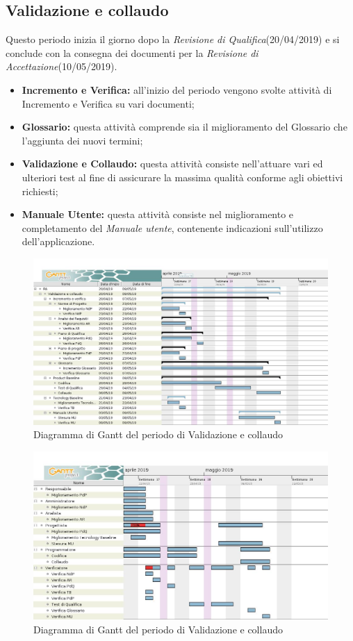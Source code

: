 \newpage
\subsection{Validazione e collaudo}
Questo periodo inizia il giorno dopo la  \textit{Revisione di Qualifica}(20/04/2019) e si conclude con la consegna dei documenti per la  \textit{Revisione di Accettazione}(10/05/2019). 
\begin{itemize}
	\item{\textbf{Incremento e Verifica:} all’inizio del periodo vengono svolte attività di Incremento e Verifica su vari documenti;}
	\item{\textbf{Glossario:} questa attività comprende sia il miglioramento del Glossario che l’aggiunta dei nuovi termini;}
	\item{\textbf{Validazione e Collaudo:} questa attività consiste nell'attuare vari ed ulteriori test al fine di assicurare la massima qualità conforme agli obiettivi richiesti;}
	\item{\textbf{Manuale Utente:} questa attività consiste nel miglioramento e completamento del \textit{Manuale utente}, contenente indicazioni sull’utilizzo dell’applicazione.}
\end{itemize}

\begin{figure}[h!]
	\centering
	\includegraphics[width=\textwidth]{gantcollaudo.jpg}
	\caption{Diagramma di Gantt del periodo di Validazione e collaudo}
\end{figure}

\begin{figure}[h!]
	\centering
	\includegraphics[width=\textwidth]{gantcollaudorisorse.jpg}
	\caption{Diagramma di Gantt del periodo di Validazione e collaudo}
\end{figure}

